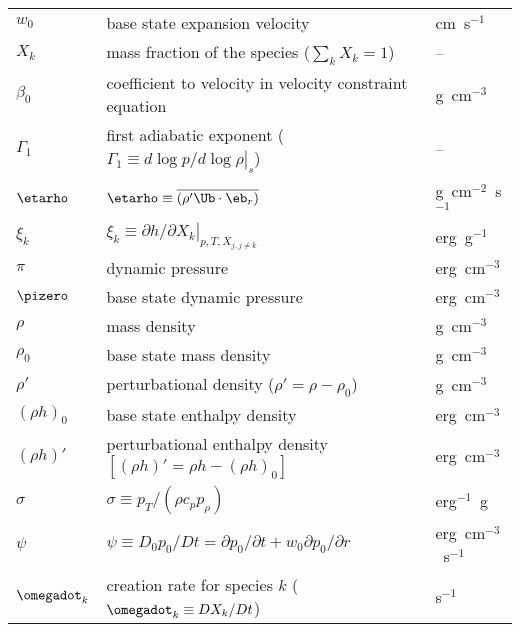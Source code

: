 \begin{center}
\begin{longtable}{|l|p{4.0in}|l|}
$w_0$   & base state expansion velocity              & cm~s$^{-1}$ \\
$X_k$   & mass fraction of the species ($\sum_k X_k = 1$) & -- \\
$\beta_0$ & coefficient to velocity
            in velocity constraint equation  & g~cm$^{-3}$ \\
$\Gamma_1$ & first adiabatic exponent ($\Gamma_1 \equiv \left . d \log p/d \log \rho \right |_s$) & -- \\
$\etarho$ & $\etarho \equiv \overline{(\rho' \Ub \cdot \eb_r)}$ & g~cm$^{-2}$~s$^{-1}$ \\
$\xi_k$ & $\xi_k \equiv \left . \partial h / \partial X_k \right |_{p,T,X_{j,j\ne k}}$ & erg~g$^{-1}$ \\
$\pi$   & dynamic pressure & erg~cm$^{-3}$ \\
$\pizero$ & base state dynamic pressure & erg~cm$^{-3}$ \\
$\rho$  & mass density  & g~cm$^{-3}$ \\
$\rho_0$  & base state mass density  & g~cm$^{-3}$ \\
$\rho'$  & perturbational density ($\rho' = \rho - \rho_0$) & g~cm$^{-3}$ \\
$(\rho h)_0$ & base state enthalpy density & erg~cm$^{-3}$  \\
$(\rho h)'$ & perturbational enthalpy density 
              $ \left [(\rho h)' = \rho h - (\rho h)_0 \right ]$ & erg~cm$^{-3}$  \\
$\sigma$ & $\sigma \equiv p_T/(\rho c_p p_\rho)$ & erg$^{-1}$~g \\
$\psi$  & $\psi \equiv D_0 p_0/Dt = \partial p_0/\partial t + w_0\partial p_0/\partial r$ & erg~cm$^{-3}$~s$^{-1}$ \\
$\omegadot_k$ & creation rate for species $k$ ($\omegadot_k \equiv DX_k/Dt$) & s$^{-1}$ \\
\end{longtable}
\end{center}
\renewcommand{\arraystretch}{1.0}


